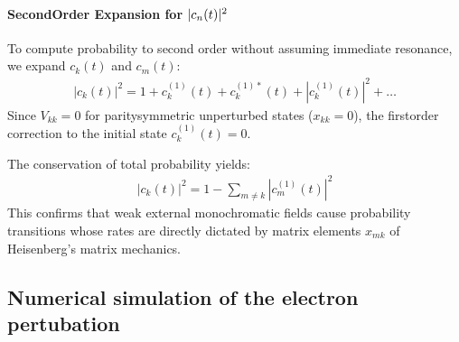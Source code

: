 \documentclass[letterpaper,10pt,english]{jupyterBook}
\begin{document}
\paragraph{Second\sphinxhyphen{}Order Expansion for \protect\(|c_n(t)|^2\protect\)}
\label{\detokenize{ch/quantum-mechanics/history/heisenberg-reinterpretation:second-order-expansion-for-c-n-t-2}}
\sphinxAtStartPar
To compute probability to second order without assuming immediate resonance, we expand \(c_k(t)\) and \(c_m(t)\):
\begin{equation*}
\begin{split}|c_k(t)|^2 = 1 + c_k^{(1)}(t) + c_k^{(1)*}(t) + |c_k^{(1)}(t)|^2 + \dots\end{split}
\end{equation*}
\sphinxAtStartPar
Since \(V_{kk} = 0\) for parity\sphinxhyphen{}symmetric unperturbed states (\(x_{kk} = 0\)), the first\sphinxhyphen{}order correction to the initial state \(c_k^{(1)}(t) = 0\).

\sphinxAtStartPar
The conservation of total probability yields:
\begin{equation*}
\begin{split}|c_k(t)|^2 = 1 - \sum_{m \neq k} |c_m^{(1)}(t)|^2\end{split}
\end{equation*}
\sphinxAtStartPar
This confirms that weak external monochromatic fields cause probability transitions whose rates are directly dictated by matrix elements \(x_{mk}\) of Heisenberg’s matrix mechanics.

\sphinxstepscope


\subsection{Numerical simulation of the electron pertubation}
\label{\detokenize{ch/quantum-mechanics/history/matrix-mechanics/electron-perturbation-numerical:numerical-simulation-of-the-electron-pertubation}}\label{\detokenize{ch/quantum-mechanics/history/matrix-mechanics/electron-perturbation-numerical:quantum-mechanics-electron-perturbation-numerical-simulation}}\label{\detokenize{ch/quantum-mechanics/history/matrix-mechanics/electron-perturbation-numerical::doc}}
\end{document}
